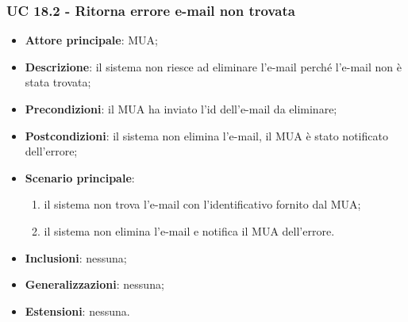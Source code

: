 \subsubsection{UC 18.2 - Ritorna errore e-mail non trovata} \label{sec:UC18.2}
    \begin{itemize}
        \item \textbf{Attore principale}: MUA;
        \item \textbf{Descrizione}: il sistema non riesce ad eliminare l'e-mail perché l'e-mail non è stata trovata;
        \item \textbf{Precondizioni}: il MUA ha inviato l'id dell'e-mail da eliminare;
        \item \textbf{Postcondizioni}: il sistema non elimina l'e-mail, il MUA è stato notificato dell'errore;
        \item \textbf{Scenario principale}:
            \begin{enumerate}
                \item il sistema non trova l'e-mail con l'identificativo fornito dal MUA;
                \item il sistema non elimina l'e-mail e notifica il MUA dell'errore.
            \end{enumerate}
        \item \textbf{Inclusioni}: nessuna;
        \item \textbf{Generalizzazioni}: nessuna;
        \item \textbf{Estensioni}: nessuna.
    \end{itemize}
